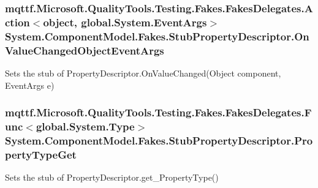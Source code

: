 \hypertarget{class_system_1_1_component_model_1_1_fakes_1_1_stub_property_descriptor_aacd5c5810a5fa57460d3c0bd18b97e8e}{
\subsubsection[{On\-Value\-Changed\-Object\-Event\-Args}]{\setlength{\rightskip}{0pt plus 5cm}mqttf.\-Microsoft.\-Quality\-Tools.\-Testing.\-Fakes.\-Fakes\-Delegates.\-Action$<$object, global.\-System.\-Event\-Args$>$ System.\-Component\-Model.\-Fakes.\-Stub\-Property\-Descriptor.\-On\-Value\-Changed\-Object\-Event\-Args}}\label{class_system_1_1_component_model_1_1_fakes_1_1_stub_property_descriptor_aacd5c5810a5fa57460d3c0bd18b97e8e}


Sets the stub of Property\-Descriptor.\-On\-Value\-Changed(\-Object component, Event\-Args e)

\hypertarget{class_system_1_1_component_model_1_1_fakes_1_1_stub_property_descriptor_a374d78e2df16a021b79125c92032aa89}{
\subsubsection[{Property\-Type\-Get}]{\setlength{\rightskip}{0pt plus 5cm}mqttf.\-Microsoft.\-Quality\-Tools.\-Testing.\-Fakes.\-Fakes\-Delegates.\-Func$<$global.\-System.\-Type$>$ System.\-Component\-Model.\-Fakes.\-Stub\-Property\-Descriptor.\-Property\-Type\-Get}}\label{class_system_1_1_component_model_1_1_fakes_1_1_stub_property_descriptor_a374d78e2df16a021b79125c92032aa89}


Sets the stub of Property\-Descriptor.\-get\-\_\-\-Property\-Type()

